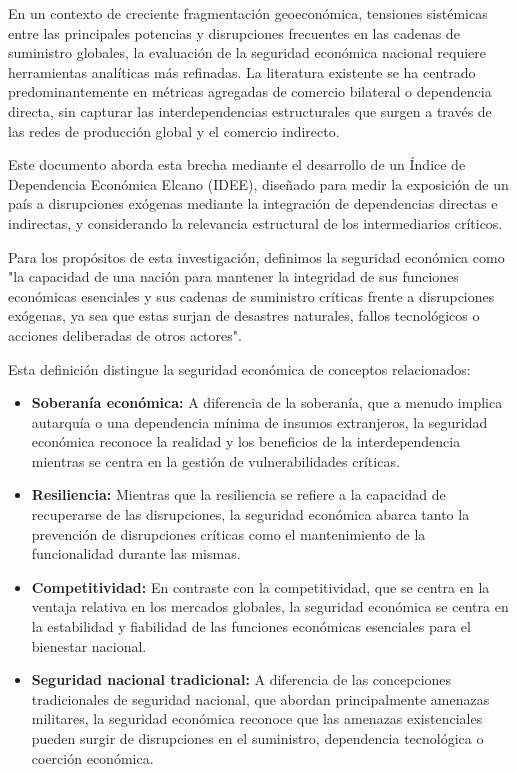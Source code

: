 \documentclass[final,1p,times,authoryear]{elsarticle}
\begin{document}
En un contexto de creciente fragmentación geoeconómica, tensiones sistémicas entre las principales potencias y disrupciones frecuentes en las cadenas de suministro globales, la evaluación de la seguridad económica nacional requiere herramientas analíticas más refinadas. La literatura existente se ha centrado predominantemente en métricas agregadas de comercio bilateral o dependencia directa, sin capturar las interdependencias estructurales que surgen a través de las redes de producción global y el comercio indirecto.

Este documento aborda esta brecha mediante el desarrollo de un Índice de Dependencia Económica Elcano (IDEE), diseñado para medir la exposición de un país a disrupciones exógenas mediante la integración de dependencias directas e indirectas, y considerando la relevancia estructural de los intermediarios críticos.

Para los propósitos de esta investigación, definimos la seguridad económica como "la capacidad de una nación para mantener la integridad de sus funciones económicas esenciales y sus cadenas de suministro críticas frente a disrupciones exógenas, ya sea que estas surjan de desastres naturales, fallos tecnológicos o acciones deliberadas de otros actores".

Esta definición distingue la seguridad económica de conceptos relacionados:
\begin{itemize}
    \item \textbf{Soberanía económica:} A diferencia de la soberanía, que a menudo implica autarquía o una dependencia mínima de insumos extranjeros, la seguridad económica reconoce la realidad y los beneficios de la interdependencia mientras se centra en la gestión de vulnerabilidades críticas.
    \item \textbf{Resiliencia:} Mientras que la resiliencia se refiere a la capacidad de recuperarse de las disrupciones, la seguridad económica abarca tanto la prevención de disrupciones críticas como el mantenimiento de la funcionalidad durante las mismas.
    \item \textbf{Competitividad:} En contraste con la competitividad, que se centra en la ventaja relativa en los mercados globales, la seguridad económica se centra en la estabilidad y fiabilidad de las funciones económicas esenciales para el bienestar nacional.
    \item \textbf{Seguridad nacional tradicional:} A diferencia de las concepciones tradicionales de seguridad nacional, que abordan principalmente amenazas militares, la seguridad económica reconoce que las amenazas existenciales pueden surgir de disrupciones en el suministro, dependencia tecnológica o coerción económica.
\end{itemize}
\end{document}
